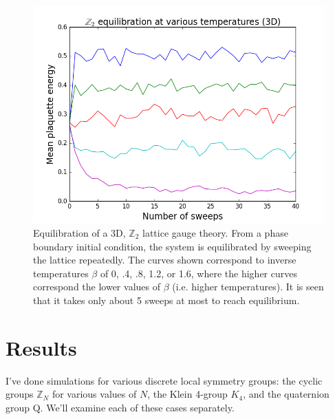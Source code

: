 \documentclass[9pt,twocolumn,twoside]{article}
\begin{document}
\begin{figure}[h!]
	\begin{centering}
	\includegraphics[width=\columnwidth]{equilibration}
	\caption[$\mathbb{Z}_2$ lattice gauge theory phase diagram for a 3D lattice.]{Equilibration of a 3D, $\mathbb{Z}_2$ lattice gauge theory.  From a phase boundary initial condition, the system is equilibrated by sweeping the lattice repeatedly.  The curves shown correspond to inverse temperatures $\beta$ of 0, .4, .8, 1.2, or 1.6, where the higher curves correspond the lower values of $\beta$ (i.e. higher temperatures).  It is seen that it takes only about 5 sweeps at most to reach equilibrium.}
	\label{equilibration}
	\end{centering}
\end{figure}

\section{Results}
I've done simulations for various discrete local symmetry groups: the cyclic groups $\mathbb{Z}_N$ for various values of $N$, the Klein 4-group $K_4$, and the quaternion group Q.  We'll examine each of these cases separately.
\end{document}
